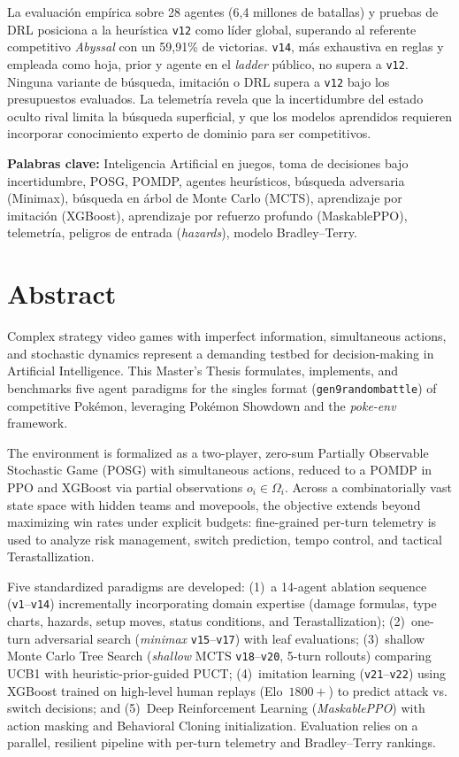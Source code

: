 La evaluación empírica sobre 28 agentes (6,4 millones de batallas) y pruebas de DRL posiciona a la heurística \texttt{v12} como líder global, superando al referente competitivo \textit{Abyssal} con un 59,91\% de victorias. \texttt{v14}, más exhaustiva en reglas y empleada como hoja, prior y agente en el \emph{ladder} público, no supera a \texttt{v12}. Ninguna variante de búsqueda, imitación o DRL supera a \texttt{v12} bajo los presupuestos evaluados. La telemetría revela que la incertidumbre del estado oculto rival limita la búsqueda superficial, y que los modelos aprendidos requieren incorporar conocimiento experto de dominio para ser competitivos.

\vspace{0.3cm}
\noindent\textbf{Palabras clave:} Inteligencia Artificial en juegos, toma de decisiones bajo incertidumbre, POSG, POMDP, agentes heurísticos, búsqueda adversaria (Minimax), búsqueda en árbol de Monte Carlo (MCTS), aprendizaje por imitación (XGBoost), aprendizaje por refuerzo profundo (MaskablePPO), telemetría, peligros de entrada (\emph{hazards}), modelo Bradley--Terry.

\clearpage

\chapter*{Abstract}
Complex strategy video games with imperfect information, simultaneous actions, and stochastic dynamics represent a demanding testbed for decision-making in Artificial Intelligence. This Master's Thesis formulates, implements, and benchmarks five agent paradigms for the singles format (\texttt{gen9randombattle}) of competitive Pokémon, leveraging Pokémon Showdown and the \textit{poke-env} framework.

The environment is formalized as a two-player, zero-sum Partially Observable Stochastic Game (POSG) with simultaneous actions, reduced to a POMDP in PPO and XGBoost via partial observations $o_i \in \Omega_i$. Across a combinatorially vast state space with hidden teams and movepools, the objective extends beyond maximizing win rates under explicit budgets: fine-grained per-turn telemetry is used to analyze risk management, switch prediction, tempo control, and tactical Terastallization.

Five standardized paradigms are developed: (1)~a 14-agent ablation sequence (\texttt{v1}--\texttt{v14}) incrementally incorporating domain expertise (damage formulas, type charts, hazards, setup moves, status conditions, and Terastallization); (2)~one-turn adversarial search (\emph{minimax} \texttt{v15}--\texttt{v17}) with leaf evaluations; (3)~shallow Monte Carlo Tree Search (\emph{shallow} MCTS \texttt{v18}--\texttt{v20}, 5-turn rollouts) comparing UCB1 with heuristic-prior-guided PUCT; (4)~imitation learning (\texttt{v21}--\texttt{v22}) using XGBoost trained on high-level human replays (Elo~$1800+$) to predict attack vs. switch decisions; and (5)~Deep Reinforcement Learning (\emph{MaskablePPO}) with action masking and Behavioral Cloning initialization. Evaluation relies on a parallel, resilient pipeline with per-turn telemetry and Bradley--Terry rankings.


